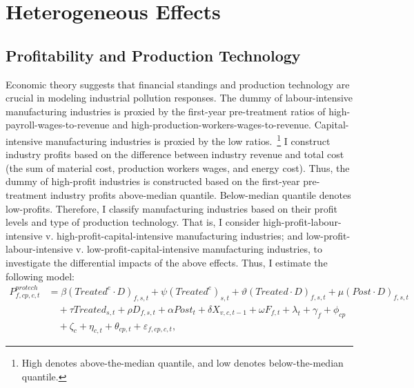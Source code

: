 \documentclass[authoryear, preprint, twocolumn, 1p]{elsarticle}
\begin{document}
    \section{Heterogeneous Effects}\label{sec:heterogeneous-effects}

    \subsection{Profitability and Production Technology}\label{subsec:profitability-and-production-technology}
    Economic theory suggests that financial standings and production technology are crucial in modeling industrial pollution responses. The dummy of labour-intensive manufacturing industries is proxied by the first-year pre-treatment ratios of high-payroll-wages-to-revenue and high-production-workers-wages-to-revenue. Capital-intensive manufacturing industries is proxied by the low ratios.~\footnote{High denotes above-the-median quantile, and low denotes below-the-median quantile.} I construct industry profits based on the difference between industry revenue and total cost (the sum of material cost, production workers wages, and energy cost). Thus, the dummy of high-profit industries is constructed based on the first-year pre-treatment industry profits above-median quantile. Below-median quantile denotes low-profits. Therefore, I classify manufacturing industries based on their profit levels and type of production technology. That is, I consider high-profit-labour-intensive v. high-profit-capital-intensive manufacturing industries; and low-profit-labour-intensive v. low-profit-capital-intensive manufacturing industries, to investigate the differential impacts of the above effects. Thus, I estimate the following model:
    \begin{align}
        P_{f,cp,c,t}^{protech} &= \beta (Treated^{e} \cdot D)_{f,s,t} + \psi (Treated^{e})_{s,t} + \vartheta (Treated \cdot D)_{f,s,t} + \mu (Post \cdot D)_{f,s,t} \nonumber \\
        &\quad + \tau Treated_{s,t} + \rho D_{f,s,t} + \alpha Post_{t} + \delta X_{v,c,t-1} + \omega F_{f,t} + \lambda_{t} + \gamma_{f} + \phi_{cp} \nonumber \\
        &\quad + \zeta_{c} + \eta_{c,t} + \theta_{cp,t} + \varepsilon_{f,cp,c,t},\label{eq:heterogeneous-onsite-releases-intensity-protech}
    \end{align}
\end{document}
